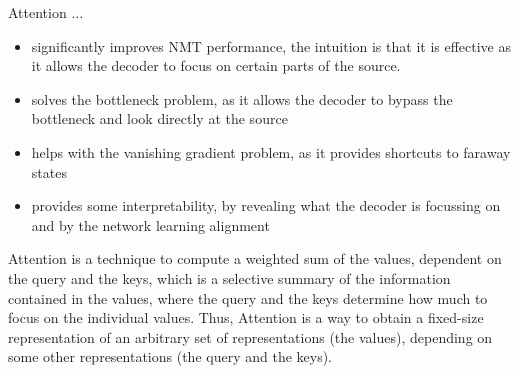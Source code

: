 \documentclass[11pt]{article}
\begin{document}
\noindent
Attention ...
\begin{itemize}
	\item significantly improves NMT performance, the intuition is that it is effective as it allows the decoder to focus on certain parts of the source.
	\item solves the bottleneck problem, as it allows the decoder to bypass the bottleneck and look directly at the source
	\item helps with the vanishing gradient problem, as it provides shortcuts to faraway states
	\item provides some interpretability, by revealing what the decoder is focussing on and by the network learning alignment
\end{itemize}

Attention is a technique to compute a weighted sum of the values, dependent on the query and the keys, which is a selective summary of the information contained in the values, where the query and the keys determine how much to focus on the individual values. Thus, Attention is a way to obtain a fixed-size representation of an arbitrary set of representations (the values), depending on some other representations (the query and the keys).


\printbibliography
\end{document}
